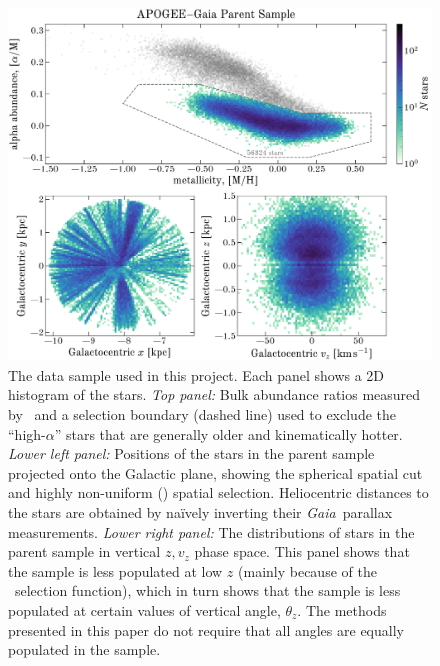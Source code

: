 \documentclass[modern]{aastex63}
\newcommand{\gaia}{\textsl{Gaia}}
\newcommand{\apogee}{\acronym{APOGEE}}
\begin{document}
\begin{figure}[!tp]
  \begin{mdframed}
  \color{captiongray}
  \begin{center}
  \includegraphics[width=\textwidth]{apogee-rgb-loalpha-mh-am-xy.pdf}
  \end{center}
  \caption{%
    The data sample used in this project.
    Each panel shows a 2D histogram of the stars.
    \textsl{Top panel:}
    Bulk abundance ratios measured by \apogee\ and a selection boundary (dashed
    line) used to exclude the ``high-$\alpha$'' stars that are generally older
    and kinematically hotter.
    \textsl{Lower left panel:}
    Positions of the stars in the parent sample projected onto the Galactic
    plane, showing the spherical spatial cut and highly non-uniform (\apogee)
    spatial selection.
    Heliocentric distances to the stars are obtained by na\"ively inverting
    their \gaia\ parallax measurements.
    \textsl{Lower right panel:}
    The distributions of stars in the parent sample in vertical $z, v_z$ phase
    space.
    This panel shows that the sample is less populated at low $z$ (mainly
    because of the \apogee\ selection function), which in turn shows that the
    sample is less populated at certain values of vertical angle, $\theta_z$.
    The methods presented in this paper do not require that all angles are
    equally populated in the sample.
    \label{fig:mh-am-xy}}
  \end{mdframed}
\end{figure}
\end{document}

